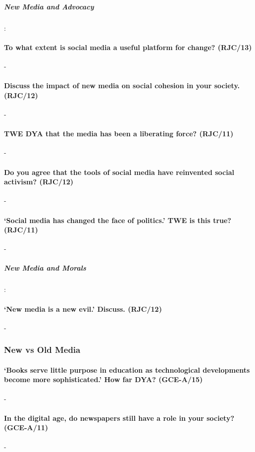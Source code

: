 \documentclass[../../main]{subfiles}
\begin{document}
\subparagraph{New Media and Advocacy} :

\paragraph{To what extent is social media a useful platform for change? (RJC/13)}-

\paragraph{Discuss the impact of new media on social cohesion in your society. (RJC/12)}-

\paragraph{TWE DYA that the media has been a liberating force? (RJC/11)}-

\paragraph{Do you agree that the tools of social media have reinvented social activism? (RJC/12)}-

\paragraph{`Social media has changed the face of politics.' TWE is this true? (RJC/11)}-

\subparagraph{New Media and Morals} :

\paragraph{`New media is a new evil.' Discuss. (RJC/12)}-

\subsubsection{New vs Old Media}

\paragraph{`Books serve little purpose in education as technological developments become more sophisticated.' How far DYA? (GCE-A/15)}-

\paragraph{In the digital age, do newspapers still have a role in your society? (GCE-A/11)}-
\end{document}
